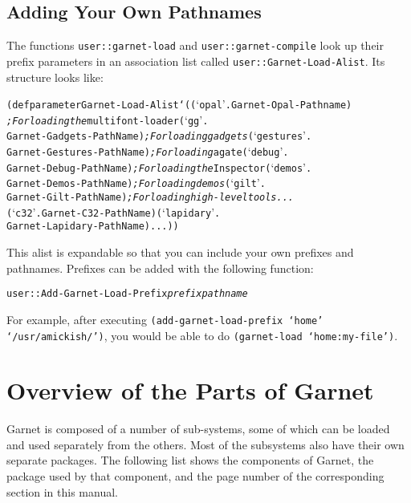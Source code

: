 \documentclass{report}
\newenvironment{programexample}{\begin{alltt}}{\end{alltt}}
\begin{document}
\subsection{Adding Your Own Pathnames}
\label{garnet-load-alist}

The functions \texttt{user::garnet-load} and \texttt{user::garnet-compile}
look up their prefix parameters in an association list called
\texttt{user::Garnet-Load-Alist}.  Its structure looks like:

\begin{programexample}
  (defparameter Garnet-Load-Alist `((`opal' . Garnet-Opal-Pathname)
  {\it ; For loading the } multifont-loader (`gg' .
  Garnet-Gadgets-PathName) {\it ; For loading gadgets} (`gestures' .
  Garnet-Gestures-PathName) {\it ; For loading } agate (`debug' .
  Garnet-Debug-PathName) {\it ; For loading the } Inspector (`demos' .
  Garnet-Demos-PathName) {\it ; For loading demos} (`gilt' .
  Garnet-Gilt-PathName) {\it ; For loading high-level tools...}
  (`c32' . Garnet-C32-PathName) (`lapidary' .
  Garnet-Lapidary-PathName) ...))
\end{programexample}

This alist is expandable so that you can include your own prefixes and
pathnames.  Prefixes can be added with the following function:

\begin{programexample}
  user::Add-Garnet-Load-Prefix {\it prefix pathname} \value{function}
\end{programexample}

For example, after executing \texttt{(add-garnet-load-prefix `home'
  `/usr/amickish/')}, you would be able to do \texttt{(garnet-load
  `home:my-file')}.



\section{Overview of the Parts of Garnet}
 

Garnet is composed of a number of sub-systems, some of which can be
loaded and used separately from the others.  Most of the subsystems
also have their own separate packages.  The following list shows the
components of Garnet, the package used by that component, and the page
number of the corresponding section in this manual.
\end{document}
